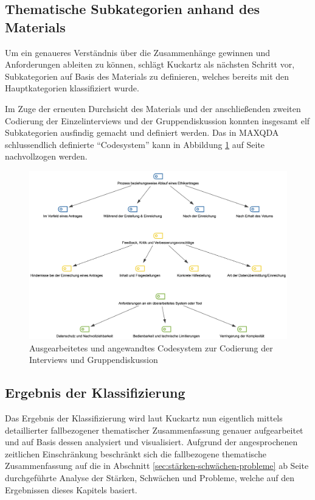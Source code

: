 \documentclass[a4paper,12pt,twoside,numbers=noendperiod]{scrreprt}
\begin{document}
\subsection{Thematische Subkategorien anhand des Materials}
\label{sub-sec:thematische-subkategorien}

Um ein genaueres Verständnis über die Zusammenhänge gewinnen und Anforderungen ableiten zu können, schlägt Kuckartz als nächsten Schritt vor, Subkategorien auf Basis des Materials zu definieren, welches bereits mit den Hauptkategorien klassifiziert wurde. \cite[106]{kuckartz_qualitative_2018}

Im Zuge der erneuten Durchsicht des Materials und der anschließenden zweiten Codierung der Einzelinterviews und der Gruppendiskussion konnten insgesamt elf Subkategorien ausfindig gemacht und definiert werden. Das in MAXQDA schlussendlich definierte \enquote{Codesystem} kann in Abbildung \ref{fig:angewandtes-codesystem} auf Seite \pageref{fig:angewandtes-codesystem} nachvollzogen werden.

\begin{figure}[ht]
    \centering
    \includegraphics[width=\linewidth]{thesis/images/Luidold_Codesystem.png}
    \caption{Ausgearbeitetes und angewandtes Codesystem zur Codierung der Interviews und Gruppendiskussion}
    \label{fig:angewandtes-codesystem}
\end{figure}

\subsection{Ergebnis der Klassifizierung}
\label{sub-sec:ergebnis-klassifizierung}

Das Ergebnis der Klassifizierung wird laut Kuckartz nun eigentlich mittels detaillierter fallbezogener thematischer Zusammenfassung genauer aufgearbeitet und auf Basis dessen analysiert und visualisiert. \cite[111-121]{kuckartz_qualitative_2018} Aufgrund der angesprochenen zeitlichen Einschränkung beschränkt sich die fallbezogene thematische Zusammenfassung auf die in Abschnitt \ref{sec:stärken-schwächen-probleme} ab Seite \pageref{sec:stärken-schwächen-probleme} durchgeführte Analyse der Stärken, Schwächen und Probleme, welche auf den Ergebnissen dieses Kapitels basiert.
\end{document}
